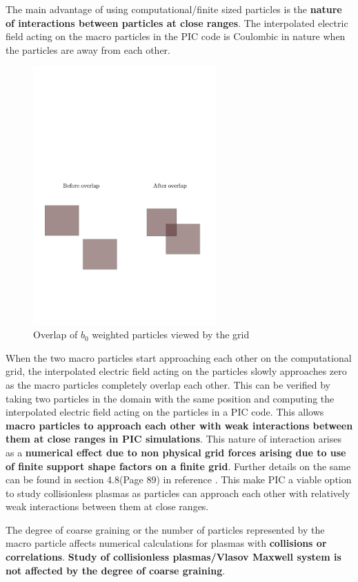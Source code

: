 \documentclass{article}
\begin{document}
The main advantage of using computational/finite sized particles is the \textbf{nature of interactions between particles at close ranges}. The interpolated electric field acting on the macro particles in the PIC code is Coulombic in nature when the particles are away from each other.  

\begin{figure}[!htb]
\includegraphics[width=7cm]{finiteParticles}
\caption{Overlap of $b_{0}$ weighted particles viewed by the grid}
\end{figure}

When the two macro particles start approaching each other on the computational grid, the interpolated electric field acting on the particles slowly approaches zero as the macro particles completely overlap each other. This can be verified by taking two particles in the domain with the same position and computing the interpolated electric field acting on the particles in a PIC code. This allows \textbf{macro particles to approach each other with weak interactions between them at close ranges in PIC simulations}. This nature of interaction arises as a \textbf{numerical effect due to non physical grid forces arising due to use of finite support shape factors on a finite grid}. Further details on the same can be found in section 4.8(Page 89) in reference \cite{3}. This make PIC a viable option to study collisionless plasmas as particles can approach each other with relatively weak interactions between them at close ranges. 

The degree of coarse graining or the number of particles represented by the macro particle affects numerical calculations for plasmas with \textbf{collisions or correlations}. \textbf{Study of collisionless plasmas/Vlasov Maxwell system is not affected by the degree of coarse graining}\cite{6}.
\end{document}
